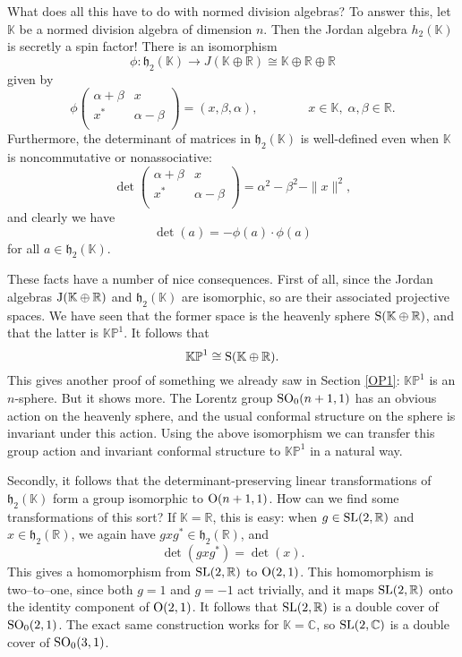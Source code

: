 \documentclass[12pt]{article}
\newcommand\R{{\mathbb R}}
\newcommand\C{{\mathbb C}}
\newcommand\K{{\mathbb K}}
\newcommand\KP{{\mathbb {KP}}}
\newcommand{\J}{{\rm J}}
\newcommand{\OO}{{\rm O}}
\newcommand{\SO}{{\rm SO}}
\newcommand{\SL}{{\rm SL}}
\newcommand{\h}{{\mathfrak {h}}}
\newcommand{\iso}{\cong}
\newcommand{\be}{\begin{equation}}
\newcommand{\ee}{\end{equation}}
\newcommand{\maps}{\colon}
\begin{document}
What does all this have to do with normed division algebras?   To answer 
this, let $\K$ be a normed division algebra of dimension $n$.  Then  
the Jordan algebra $h_2(\K)$ is secretly a spin factor!  There is an  
isomorphism  
\[   \phi \maps \h_2(\K) \to J(\K \oplus \R) \iso \K \oplus \R \oplus \R \] 
given by 
\be  \phi \left( \begin{array}{cc}     \alpha + \beta & x     \\  
                                   x^\ast & \alpha - \beta \\  
\end{array} \right) = (x, \beta, \alpha) , 
\qquad \qquad x \in \K, \; \alpha, \beta \in \R .  \label{h2} \ee
Furthermore, the determinant of matrices in $\h_2(\K)$ is well-defined  
even when $\K$ is noncommutative or nonassociative: 
\[  \det \left( \begin{array}{cc}  \alpha + \beta & x     \\  
                                   x^\ast & \alpha - \beta \\  
\end{array} \right) = \alpha^2 - \beta^2 - \|x\|^2 ,  \] 
and clearly we have  
\[      \det(a) = -\phi(a) \cdot \phi(a) \] 
for all $a \in \h_2(\K)$.    
 
These facts have a number of nice consequences.  First of all, since the 
Jordan algebras $\J(\K \oplus \R)$ and $\h_2(\K)$ are isomorphic, so are 
their associated projective spaces.   We have seen that the former space 
is the heavenly sphere ${\rm S}(\K \oplus \R)$, and that the latter is 
$\KP^1$.  It follows that 
\[    \KP^1 \iso {\rm S}(\K \oplus \R) . \] 
This gives another proof of something we already saw in Section 
\ref{OP1}: $\KP^1$ is an $n$-sphere.  But it shows more.   The Lorentz 
group $\SO_0(n+1,1)$ has an obvious action on the heavenly sphere, and 
the usual conformal structure on the sphere is invariant under this 
action.  Using the above isomorphism we can transfer this group action 
and invariant conformal structure to $\KP^1$ in a natural way. 
 
Secondly, it follows that the determinant-preserving linear 
transformations of $\h_2(\K)$ form a group isomorphic to $\OO(n+1,1)$.  
How can we find some transformations of this sort?  If $\K = \R$, this 
is easy: when $g \in \SL(2,\R)$ and $x \in \h_2(\R)$, we again have 
$gxg^* \in \h_2(\R)$, and   
\[     \det(gxg^*) = \det(x). \]  
This gives a homomorphism from $\SL(2,\R)$ to ${\rm O}(2,1)$.  This 
homomorphism is two--to--one, since both $g = 1$ and $g = -1$ act 
trivially, and it maps $\SL(2,\R)$ onto the identity component of ${\rm 
O}(2,1)$.  It follows that $\SL(2,\R)$ is a double cover of  
$\SO_0(2,1)$.  The exact same construction works for $\K = \C$, so 
$\SL(2,\C)$ is a double cover of $\SO_0(3,1)$.    
 
\end{document}
